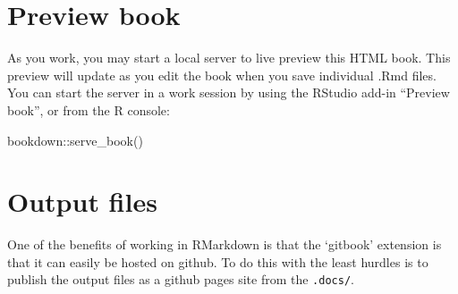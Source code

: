 \documentclass[
]{book}
\newenvironment{Shaded}{\begin{snugshade}}{\end{snugshade}}
\newcommand{\FunctionTok}[1]{\textcolor[rgb]{0.00,0.00,0.00}{#1}}
\newcommand{\NormalTok}[1]{#1}
\newcommand{\SpecialCharTok}[1]{\textcolor[rgb]{0.00,0.00,0.00}{#1}}
\begin{document}
\hypertarget{preview-book}{%
\section{Preview book}\label{preview-book}}

As you work, you may start a local server to live preview this HTML book. This preview will update as you edit the book when you save individual .Rmd files. You can start the server in a work session by using the RStudio add-in ``Preview book'', or from the R console:

\begin{Shaded}
\begin{Highlighting}[]
\NormalTok{bookdown}\SpecialCharTok{::}\FunctionTok{serve\_book}\NormalTok{()}
\end{Highlighting}
\end{Shaded}

\hypertarget{output-files}{%
\section{Output files}\label{output-files}}

One of the benefits of working in RMarkdown is that the `gitbook' extension is that it can easily be hosted on github. To do this with the least hurdles is to publish the output files as a github pages site from the \texttt{.docs/}.

  
\end{document}
